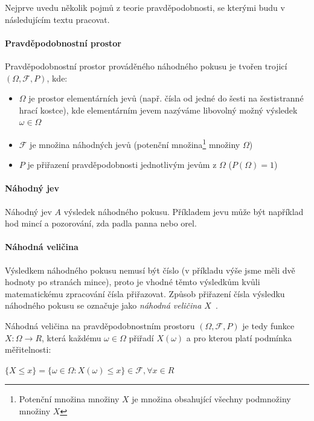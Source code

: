 \documentclass[thesis=M,czech]{FITthesis}[2014/05/07]
\begin{document}
Nejprve uvedu několik pojmů z teorie pravděpodobnosti, se kterými budu v následujícím textu pracovat.

\paragraph{Pravděpodobnostní prostor}

Pravděpodobnostní prostor prováděného náhodného pokusu je tvořen trojicí $(\Omega,\mathcal{F},P)$, kde:
	\begin{itemize}
		\item $\Omega$ je prostor elementárních jevů (např. čísla od jedné do šesti na šestistranné hrací kostce), kde elementárním jevem nazýváme libovolný možný výsledek $\omega \in \Omega$ 
		\item $\mathcal{F}$ je množina náhodných jevů (potenční množina\footnote{Potenční množina množiny $X$ je množina obsahující všechny podmnožiny množiny $X$} množiny $\Omega$)
		\item $P$ je přiřazení pravděpodobnosti jednotlivým jevům z $\Omega$ ($P(\Omega)=1$)
	\end{itemize}

\paragraph{Náhodný jev}
	
Náhodný jev $A$ výsledek náhodného pokusu. Příkladem jevu může být například hod mincí a pozorování, zda padla panna nebo orel.

\paragraph{Náhodná veličina}
	\label{randomvel}
Výsledkem náhodného pokusu nemusí být číslo (v příkladu výše jsme měli dvě hodnoty po stranách mince), proto je vhodné těmto výsledkům kvůli matematickému zpracování čísla přiřazovat. Způsob přiřazení čísla výsledku náhodného pokusu se označuje jako \emph{náhodná veličina $X$}~\cite{pst1}. 

Náhodná veličina na pravděpodobnostním prostoru $(\Omega,\mathcal{F},P)$ je tedy funkce $X: \Omega \to R$, která každému $\omega \in \Omega$ přiřadí $X(\omega)$ a pro kterou platí podmínka měřitelnosti:

\begin{center}
$\{ X \leq x \} = \{ \omega \in \Omega: X(\omega) \leq x \} \in \mathcal{F}, \forall x \in R$
\end{center}
\end{document}

